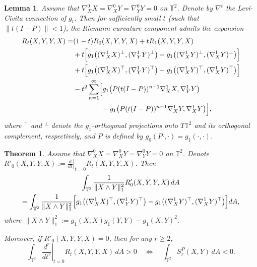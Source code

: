 \documentclass[10pt,a4paper]{amsart}
\newtheorem{lemma}{Lemma}
\newtheorem{theorem}{Theorem}
\begin{document}
\begin{lemma}\label{lem:resolvetudo}
Assume that $\nabla^0_X X = \nabla^0_X Y = \nabla^0_Y Y = 0$ on $\mathbb{T}^2$. Denote by $\nabla^t$ the Levi-Civita connection of $g_t$. Then for sufficiently small $t$ (such that $\|t(I-P)\| < 1$), the Riemann curvature component admits the expansion
\begin{align}
R_t(X,Y,Y,X) =& (1-t)R_0(X,Y,Y,X) + tR_1(X,Y,Y,X) \nonumber \\
&+ t\Bigl[g_1\bigl((\nabla^1_X X)^\perp, (\nabla^1_Y Y)^\perp\bigr) 
     - g_1\bigl((\nabla^1_X Y)^\perp, (\nabla^1_X Y)^\perp\bigr)\Bigr] \nonumber \\
&+ t\Bigl[g_1\bigl((\nabla^1_X X)^\top, (\nabla^1_Y Y)^\top\bigr) 
     - g_1\bigl((\nabla^1_X Y)^\top, (\nabla^1_X Y)^\top\bigr)\Bigr] \nonumber \\
&- t^2\sum_{n=1}^\infty \Bigl[g_1\bigl(P(t(I-P))^{n-1}\nabla^1_X X, \nabla^1_Y Y\bigr) \nonumber \\
&\qquad\qquad - g_1\bigl(P(t(I-P))^{n-1}\nabla^1_X Y, \nabla^1_X Y\bigr)\Bigr],
\end{align}
where $^\top$ and $^\perp$ denote the $g_1$-orthogonal projections onto $T\mathbb{T}^2$ and its orthogonal complement, respectively, and $P$ is defined by $g_0(P\cdot,\cdot)=g_1(\cdot,\cdot)$.
\end{lemma}

\begin{theorem}\label{thm:rvariation}
Assume that $\nabla^0_X X = \nabla^0_X Y = \nabla^0_Y Y = 0$ on $\mathbb{T}^2$. Denote $R'_0(X,Y,Y,X) := \left.\frac{d}{dt}\right|_{t=0} R_t(X,Y,Y,X)$. Then
\begin{multline}\label{eq:first-variation}
\int_{\mathbb{T}^2} \frac{1}{\|X\wedge Y\|_1^2} R'_0(X,Y,Y,X) \, dA \\
= \int_{\mathbb{T}^2} \frac{1}{\|X\wedge Y\|_1^2} \Bigl[
g_1\bigl((\nabla^1_X X)^\top, (\nabla^1_Y Y)^\top\bigr) 
- g_1\bigl((\nabla^1_X Y)^\top, (\nabla^1_X Y)^\top\bigr) \Bigr] dA,
\end{multline}
where $\|X\wedge Y\|_1^2 := g_1(X,X)g_1(Y,Y) - g_1(X,Y)^2$.

Moreover, if $R'_0(X,Y,Y,X) = 0$, then for any $r \geq 2$,
\begin{equation}\label{eq:higher-order-condition}
\int_{\mathbb{T}^2} \left.\frac{d^r}{dt^r}\right|_{t=0} R_t(X,Y,Y,X) \, dA > 0 
\quad\Longleftrightarrow\quad 
\int_{\mathbb{T}^2} S_r^P(X,Y) \, dA < 0.
\end{equation}
\end{theorem}
\end{document}
